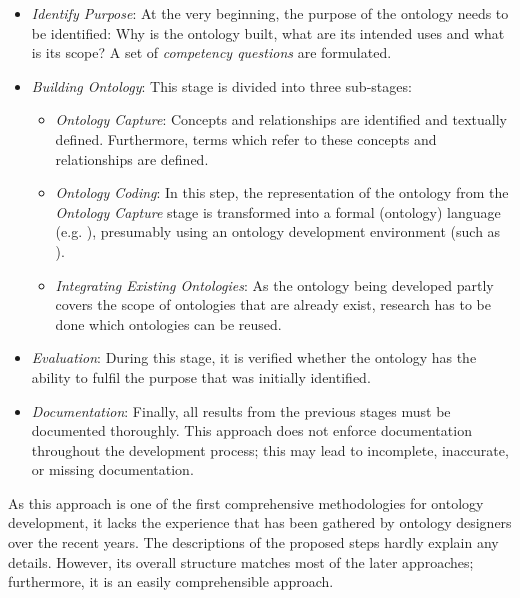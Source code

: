 \begin{itemize}
  \item \emph{Identify Purpose}: At the very beginning, the purpose of the ontology needs to be identified: Why is the ontology built, what are its intended uses and what is its scope? A set of \emph{competency questions} are formulated.
  
  \item \emph{Building Ontology}: This stage is divided into three sub-stages:
    \begin{itemize}
      \item \emph{Ontology Capture}: Concepts and relationships are identified and textually defined. Furthermore, terms which refer to these concepts and relationships are defined.
      
      \item \emph{Ontology Coding}: In this step, the representation of the ontology from the \emph{Ontology Capture} stage is transformed into a formal (ontology) language (e.g. ), presumably using an ontology development environment (such as \protege).
      
      \item \emph{Integrating Existing Ontologies}: As the ontology being developed partly covers the scope of ontologies that are already exist, research has to be done which ontologies can be reused.
    \end{itemize}
    
  \item \emph{Evaluation}: During this stage, it is verified whether the ontology has the ability to fulfil the purpose that was initially identified.
  
  \item \emph{Documentation}: Finally, all results from the previous stages must be documented thoroughly. This approach does not enforce documentation throughout the development process; this may lead to incomplete, inaccurate, or missing documentation.
    
\end{itemize}

As this approach is one of the first comprehensive methodologies for ontology development, it lacks the experience that has been gathered by ontology designers over the recent years. The descriptions of the proposed steps hardly explain any details. However, its overall structure matches most of the later approaches; furthermore, it is an easily comprehensible approach.

